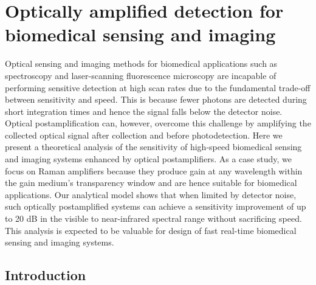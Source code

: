 \chapter{Optically amplified detection for biomedical sensing and imaging}

Optical sensing and imaging methods for biomedical applications such as spectroscopy and laser-scanning fluorescence microscopy are incapable of performing sensitive detection at high scan rates due to the fundamental trade-off between sensitivity and speed. This is because fewer photons are detected during short integration times and hence the signal falls below the detector noise. Optical postamplification can, however, overcome this challenge by amplifying the collected optical signal after collection and before photodetection. Here we present a theoretical analysis of the sensitivity of high-speed biomedical sensing and imaging systems enhanced by optical postamplifiers. As a case study, we focus on Raman amplifiers because they produce gain at any wavelength within the gain medium’s transparency window and are hence suitable for biomedical applications. Our analytical model shows that when limited by detector noise, such optically postamplified systems can achieve a sensitivity improvement of up to 20 dB in the visible to near-infrared spectral range without sacrificing speed. This analysis is expected to be valuable for design of fast real-time biomedical sensing and imaging systems.

\section{Introduction} \label{sec:JOSAA2013_Section1}

